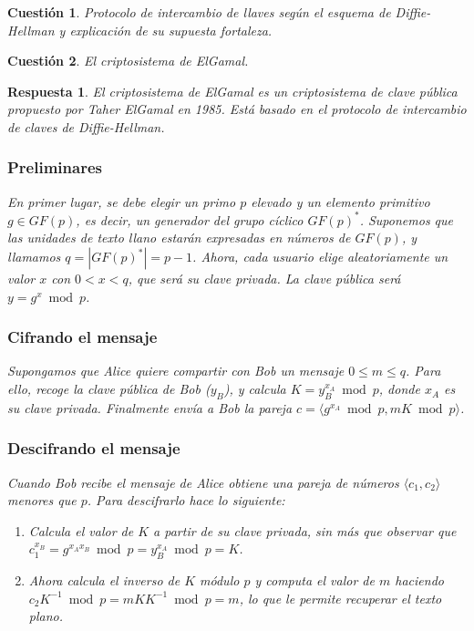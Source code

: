 \documentclass[
  a4paper,
  spanish,
  12pt,
]{scrartcl}
\theoremstyle{ejercicio-style}
\newtheorem{ejer}{Cuestión}
\theoremstyle{remark-style}
\newtheorem*{sol}{Respuesta}
\theoremstyle{teorema-style}
\begin{document}
\begin{ejer}
  Protocolo de intercambio de llaves según el esquema de Diffie-Hellman y explicación de su supuesta fortaleza.
\end{ejer}

\begin{ejer}
  El criptosistema de ElGamal.
\end{ejer}

\begin{sol}
El criptosistema de ElGamal es un criptosistema de clave pública propuesto por Taher ElGamal en 1985. Está basado en el protocolo de intercambio de claves de Diffie-Hellman.

\subsubsection*{Preliminares}

En primer lugar, se debe elegir un primo $p$ elevado y un elemento primitivo $g \in GF(p)$, es decir, un generador del grupo cíclico $GF(p)^\ast$. Suponemos que las unidades de texto llano estarán expresadas en números de $GF(p)$, y llamamos $q = |GF(p)^\ast| = p -1$. Ahora, cada usuario elige aleatoriamente un valor $x$ con $0 < x < q$, que será su clave privada. La clave pública será $y = g^x \bmod p$.

\subsubsection*{Cifrando el mensaje}

Supongamos que Alice quiere compartir con Bob un mensaje \(0\leq m \leq q\). Para ello, recoge la clave pública de Bob ($y_B$), y calcula $K = y_B ^{x_A} \bmod p$, donde $x_A$ es su clave privada. Finalmente envía a Bob la pareja \(c = \langle g^{x_{A}} \bmod{p}, mK \bmod p\rangle\).

\subsubsection*{Descifrando el mensaje}

Cuando Bob recibe el mensaje de Alice obtiene una pareja de números $\langle c_1, c_2 \rangle$ menores que $p$. Para descifrarlo hace lo siguiente:

\begin{enumerate}
  \item Calcula el valor de $K$ a partir de su clave privada, sin más que observar que $c_1^{x_B} = g^{x_Ax_B} \bmod p = y_B^{x_A} \bmod p = K$.
  \item Ahora calcula el inverso de $K$ módulo $p$ y computa el valor de $m$ haciendo $c_2K^{-1} \bmod p = mKK^{-1} \bmod p = m$, lo que le permite recuperar el texto plano.
\end{enumerate}


\end{sol}
\end{document}
